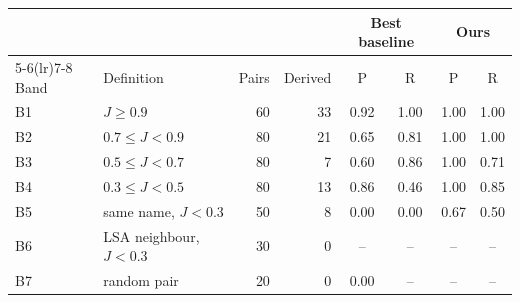 \begin{tabular}{llrrcccc}
\toprule
 & & & & \multicolumn{2}{c}{Best baseline} & \multicolumn{2}{c}{Ours} \\
\cmidrule(lr){5-6}\cmidrule(lr){7-8}
Band & Definition & Pairs & Derived & P & R & P & R \\
\midrule
B1 & $J \geq 0.9$ & 60 & 33 & 0.92 & 1.00 & 1.00 & 1.00 \\
B2 & $0.7 \leq J < 0.9$ & 80 & 21 & 0.65 & 0.81 & 1.00 & 1.00 \\
B3 & $0.5 \leq J < 0.7$ & 80 & 7 & 0.60 & 0.86 & 1.00 & 0.71 \\
B4 & $0.3 \leq J < 0.5$ & 80 & 13 & 0.86 & 0.46 & 1.00 & 0.85 \\
B5 & same name, $J<0.3$ & 50 & 8 & 0.00 & 0.00 & 0.67 & 0.50 \\
B6 & LSA neighbour, $J<0.3$ & 30 & 0 & -- & -- & -- & -- \\
B7 & random pair & 20 & 0 & 0.00 & -- & -- & -- \\
\bottomrule
\end{tabular}
